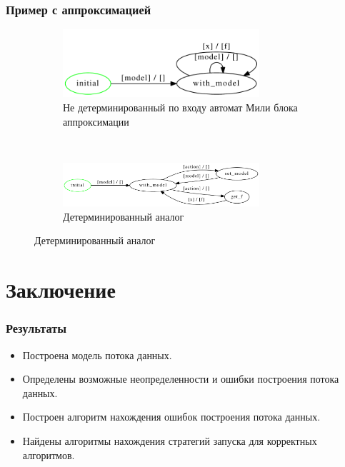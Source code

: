 \documentclass[10pt,pdf,hyperref={unicode}]{beamer}
\begin{document}
\begin{frame}
  \frametitle{Пример с аппроксимацией}
    \begin{figure}[H]
  \centering

  \begin{subfigure}[b]{\textwidth}
    \centering
    \includegraphics[width=0.8\textwidth]{approx_fa.pdf}
    \caption{Не детерминированный по входу автомат Мили блока аппроксимации}
    \label{notdetFA}
  \end{subfigure}
  ~
  \begin{subfigure}[b]{\textwidth}
    \centering
    \includegraphics[width=0.8\textwidth]{approx_fa_det.pdf}
    \caption{Детерминированный аналог}
    \label{detFA}
  \end{subfigure}
  \label{det_example}
  \end{figure} 
\end{frame}

\section{Заключение}

\begin{frame}
  \frametitle{Результаты}
  \begin{itemize}
    \item Построена модель потока данных.
    \item Определены возможные неопределенности и ошибки построения потока данных.
    \item Построен алгоритм нахождения ошибок построения потока данных.
    \item Найдены алгоритмы нахождения стратегий запуска для корректных алгоритмов.
  \end{itemize}
\end{frame}
\end{document}
